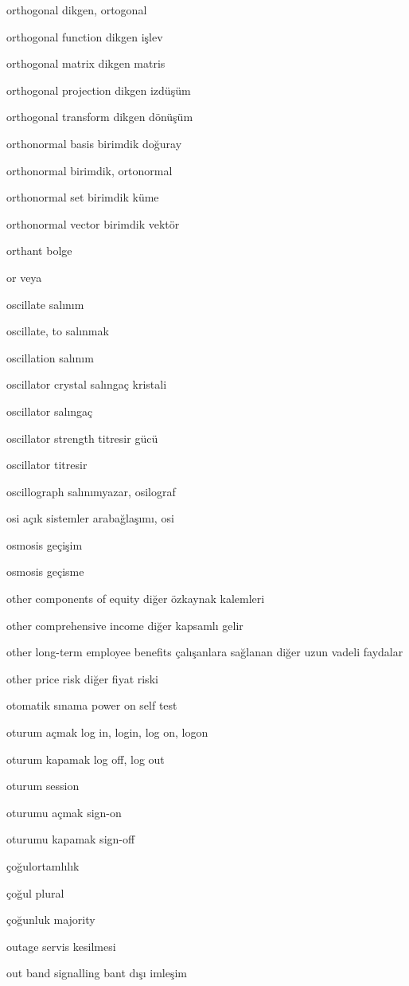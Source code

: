 \documentclass[12pt,fleqn]{article}\usepackage{../../common}
\begin{document}
orthogonal dikgen, ortogonal

orthogonal function dikgen işlev

orthogonal matrix dikgen matris

orthogonal projection dikgen izdüşüm

orthogonal transform dikgen dönüşüm

orthonormal basis birimdik doğuray

orthonormal birimdik, ortonormal

orthonormal set birimdik küme

orthonormal vector birimdik vektör

orthant bolge

or veya

oscillate salınım

oscillate, to salınmak

oscillation salınım

oscillator crystal salıngaç kristali

oscillator salıngaç

oscillator strength titresir gücü

oscillator titresir

oscillograph salınımyazar, osilograf

osi açık sistemler arabağlaşımı, osi

osmosis geçişim

osmosis geçisme

other components of equity diğer özkaynak kalemleri

other comprehensive income diğer kapsamlı gelir

other long-term employee benefits çalışanlara sağlanan diğer uzun vadeli faydalar

other price risk diğer fiyat riski

otomatik sınama power on self test

oturum açmak log in, login, log on, logon

oturum kapamak log off, log out

oturum session

oturumu açmak sign-on

oturumu kapamak sign-off

çoğulortamlılık

çoğul plural

çoğunluk majority

outage servis kesilmesi

out band signalling bant dışı imleşim
\end{document}

